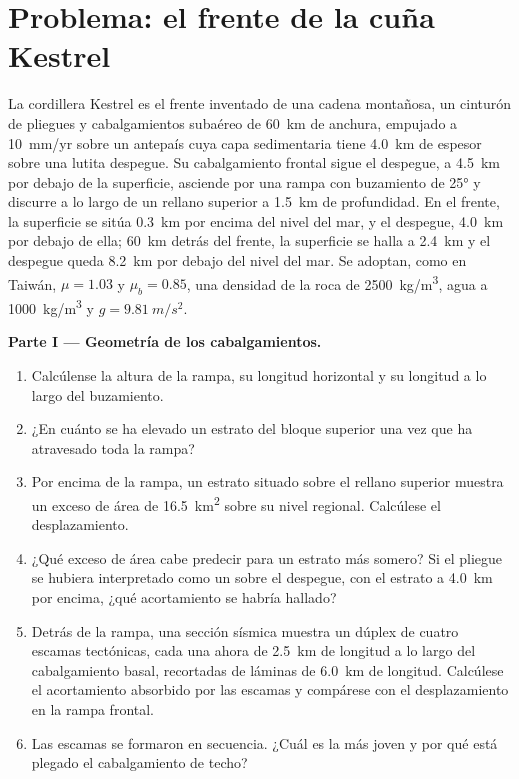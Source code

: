 \section{Problema: el frente de la cuña Kestrel}

\begin{problem}
\label{pb:b3:orogenic-wedges:1}
La cordillera Kestrel es el frente inventado de una cadena montañosa, un
cinturón de pliegues y cabalgamientos subaéreo de \qty{60}{km} de anchura, empujado a \qty{10}{mm/yr} sobre un
antepaís cuya capa sedimentaria tiene \qty{4.0}{km} de espesor sobre una lutita
despegue. Su cabalgamiento frontal sigue el despegue, a \qty{4.5}{km} por debajo
de la superficie, asciende por una rampa con buzamiento de \ang{25} y discurre a lo largo de un rellano superior
a \qty{1.5}{km} de profundidad. En el frente, la superficie se sitúa \qty{0.3}{km} por encima del
nivel del mar, y el despegue, \qty{4.0}{km} por debajo de ella; \qty{60}{km} detrás del
frente, la superficie se halla a \qty{2.4}{km} y el despegue queda
\qty{8.2}{km} por debajo del nivel del mar. Se adoptan, como en Taiwán, $\mu = 1.03$ y $\mu_b =
0.85$, una densidad de la roca de \qty{2500}{kg/m^3}, agua a \qty{1000}{kg/m^3} y
$g = \qty{9.81}{m/s^2}$.

\medskip\noindent\textbf{Parte I --- Geometría de los cabalgamientos.}
\begin{enumerate}
  \item Calcúlense la altura de la rampa, su longitud horizontal y su longitud
        a lo largo del buzamiento.
  \item ¿En cuánto se ha elevado un estrato del bloque superior una vez que ha
        atravesado toda la rampa?
  \item Por encima de la rampa, un estrato situado sobre el rellano superior muestra un exceso de área
        de \qty{16.5}{km^2} sobre su nivel regional. Calcúlese el desplazamiento.
  \item ¿Qué exceso de área cabe predecir para un estrato más somero? Si el pliegue se hubiera
        interpretado como un  sobre el despegue, con el estrato
        a \qty{4.0}{km} por encima, ¿qué acortamiento se habría hallado?
  \item Detrás de la rampa, una sección sísmica muestra un dúplex de cuatro escamas tectónicas, cada una
        ahora de \qty{2.5}{km} de longitud a lo largo del cabalgamiento basal, recortadas de
        láminas de \qty{6.0}{km} de longitud. Calcúlese el acortamiento absorbido por las
        escamas y compárese con el desplazamiento en la rampa frontal.
  \item Las escamas se formaron en secuencia. ¿Cuál es la más joven y por qué
        está plegado el cabalgamiento de techo?
\end{enumerate}


\end{problem}
